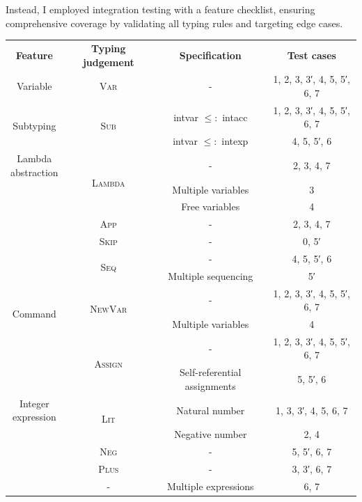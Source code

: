 \documentclass[12pt,a4paper]{report}
\theoremstyle{definition}
\begin{document}
    Instead, I employed integration testing with a feature checklist, ensuring comprehensive coverage by validating all typing rules and targeting edge cases.
    \begin{table}[H]
        \centering
        \begin{tabular}{| c | c | c | c |}
            \hline
            \textbf{Feature}  & \textbf{Typing judgement} & \textbf{Specification} & \textbf{Test cases} \\
            \hhline{|=|=|=|=|}
            Variable & \textsc{Var} & - & 1, 2, 3, 3′, 4, 5, 5′, 6, 7 \\ \cline{3-4}
            \hline
            \multirow{2}{*}{Subtyping} 
                & \multirow{2}{*}{\textsc{Sub}} 
                    & \textsf{intvar} $\leq:$ \textsf{intacc} & 1, 2, 3, 3′, 4, 5, 5′, 6, 7  \\ \cline{3-4}
                &   & \textsf{intvar} $\leq:$ \textsf{intexp} & 4, 5, 5′, 6 \\
            \hline
            \multirowcell{4}{Lambda\\abstraction} 
                & \multirow{3}{*}{\textsc{Lambda}} 
                    & - & 2, 3, 4, 7 \\ \cline{3-4}
                &   & Multiple variables & 3  \\ \cline{3-4}
                &   & Free variables & 4 \\ \cline{2-4}
                & \textsc{App} & - & 2, 3, 4, 7  \\
            \hline
            \multirow{7}{*}{Command} 
                & \textsc{Skip} & - & 0, 5′ \\ \cline{2-4}
                & \multirow{2}{*}{\textsc{Seq}} 
                    & - & 4, 5, 5′, 6 \\ \cline{3-4}
                &   & Multiple sequencing & 5′ \\ \cline{2-4}
                & \multirow{2}{*}{\textsc{NewVar}} 
                    & - & 1, 2, 3, 3′, 4, 5, 5′, 6, 7 \\ \cline{3-4}
                &   & Multiple variables & 4 \\ \cline{2-4}
                & \multirow{2}{*}{\textsc{Assign}} 
                    & -  & 1, 2, 3, 3′, 4, 5, 5′, 6, 7  \\ \cline{3-4}
                &   & Self-referential assignments & 5, 5′, 6 \\
            \hline
            \multirowcell{5}{Integer\\expression} 
                & \multirow{2}{*}{\textsc{Lit}}  
                    & Natural number  & 1, 3, 3′, 4, 5, 6, 7 \\ \cline{3-4}
                &   & Negative number & 2, 4 \\ \cline{2-4}
                & \textsc{Neg} & - & 5, 5′, 6, 7  \\ \cline{2-4}
                & \textsc{Plus} & - & 3, 3′, 6, 7  \\ \cline{2-4}
                & -             & Multiple expressions & 6, 7 \\
            \hline
        \end{tabular}


\end{table}
\end{document}
